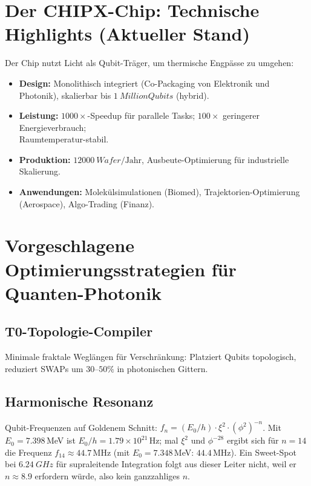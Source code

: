 	\section{Der CHIPX-Chip: Technische Highlights (Aktueller Stand)}
	
	Der Chip nutzt Licht als Qubit-Träger, um thermische Engpässe zu umgehen:
	\begin{itemize}
		\item \textbf{Design:} Monolithisch integriert (Co-Packaging von Elektronik und Photonik), skalierbar bis $\SI{1}{Million}{Qubits}$ (hybrid).
		\item \textbf{Leistung:} $1000\times$-Speedup für parallele Tasks; $100\times$ geringerer Energieverbrauch;\\ Raumtemperatur-stabil.
		\item \textbf{Produktion:} $\SI{12000}{Wafer}/\text{Jahr}$, Ausbeute-Optimierung für industrielle Skalierung.
		\item \textbf{Anwendungen:} Molekülsimulationen (Biomed), Trajektorien-Optimierung (Aerospace), Algo-Trading (Finanz).
	\end{itemize}
	
	\section{Vorgeschlagene Optimierungsstrategien für Quanten-Photonik}
	
	\subsection{T0-Topologie-Compiler}
	Minimale fraktale Weglängen für Verschränkung: Platziert Qubits topologisch, reduziert SWAPs um $30$--$50\%$ in photonischen Gittern.
	\subsection{Harmonische Resonanz}
	Qubit-Frequenzen auf Goldenem Schnitt: $f_n = (E_0 / h) \cdot \xi^2 \cdot (\phi^2)^{-n}$. Mit $E_0 = 7.398$\,MeV ist $E_0/h = 1.79 \times 10^{21}$\,Hz; mal $\xi^2$ und $\phi^{-28}$ ergibt sich für $n=14$ die Frequenz $f_{14} \approx 44.7$\,MHz (mit $E_0 = 7.348$\,MeV: $44.4$\,MHz). Ein Sweet-Spot bei $\SI{6.24}{GHz}$ für supraleitende Integration folgt aus dieser Leiter nicht, weil er $n \approx 8.9$ erfordern würde, also kein ganzzahliges $n$.
